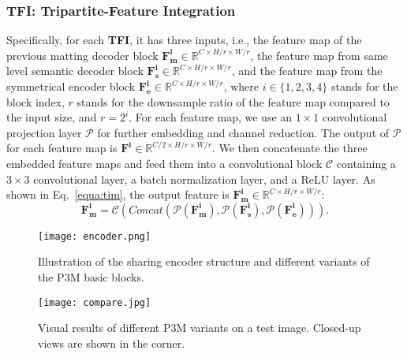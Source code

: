 \documentclass[twocolumn]{svjour3}
\begin{document}
\subsubsection{TFI: Tripartite-Feature Integration}
\label{sec:tim}
Specifically, for each \textbf{TFI}, it has three inputs, i.e., the feature map of the previous matting decoder block $\mathbf{F_m^i} \in \mathbb{R}^{C\times H/r \times W/r}$, the feature map from same level semantic decoder block $\mathbf{F_s^i} \in \mathbb{R}^{C\times H/r \times W/r}$, and the feature map from the symmetrical encoder block $\mathbf{F_e^i} \in \mathbb{R}^{C\times H/r \times W/r}$, where $i\in \{1,2,3,4\}$ stands for the block index, $r$ stands for the downsample ratio of the feature map compared to the input size, and $r=2^i$. For each feature map, we use an $1\times1$ convolutional projection layer $\mathcal{P}$ for further embedding and channel reduction. The output of $\mathcal{P}$ for each feature map is $\mathbf{F^i} \in \mathbb{R}^{C/2\times H/r \times W/r}$. We then concatenate the three embedded feature maps and feed them into a convolutional block $\mathcal{C}$ containing a
$3\times3$ convolutional layer, a batch normalization layer, and a ReLU layer. As shown in Eq.~\ref{equa:tim}, the output feature is $\mathbf{F_m^i}\in\mathbb{R}^{C\times H/r \times W/r}$:
\begin{equation}
\mathbf{F_m^i} = \mathcal{C}(Concat(\mathcal{P}(\mathbf{F^i_m}),\mathcal{P}(\mathbf{F^i_s}),\mathcal{P}(\mathbf{F^i_e}))).
\label{equa:tim}
\end{equation}

\begin{figure*}[t]
    \centering
    \texttt{[image: encoder.png]}
    \caption{Illustration of the sharing encoder structure and different variants of the P3M basic blocks.}
    \label{fig:encoder}
\end{figure*}

\begin{figure*}[!t]
    \centering
    \texttt{[image: compare.jpg]}
    \caption{Visual results of different P3M variants on a test image. Closed-up views are shown in the corner.}
    \label{fig:variants_compare}
\end{figure*}
\end{document}
